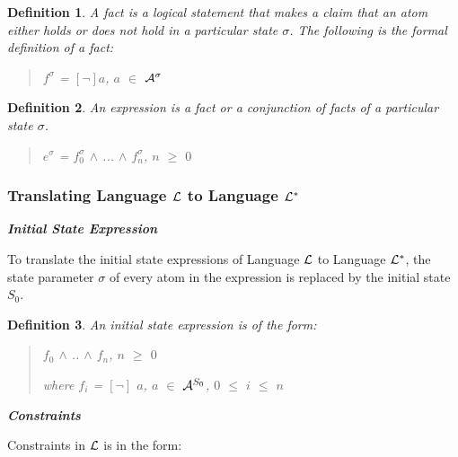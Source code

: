 \documentclass[10pt, twocolumn]{article}
\newtheorem{definition}{Definition}
\begin{document}
        \begin{definition}
          A fact is a logical statement that makes a claim that an atom either
          holds or does not hold in a particular state $\sigma$. The following
          is the formal definition of a fact:

          \begin{quote}
            $f^{\sigma}$ = $[\lnot]$$a$, $a$ $\in$ ${\cal A}^{\sigma}$
          \end{quote}
        \end{definition}

        \begin{definition}
          An expression is a fact or a conjunction of facts of a particular
          state $\sigma$.

          \begin{quote}
            $e^{\sigma}$ = $f^{\sigma}_{0}$ $\land$ ... $\land$ $f^{\sigma}_{n}$, $n$ $\geq$ $0$
          \end{quote}
        \end{definition}

      \subsubsection{Translating Language ${\cal L}$ to Language ${\cal L^{*}}$}

        \noindent \textbf{\emph{Initial State Expression}}

          To translate the initial state expressions of Language ${\cal L}$ to
          Language ${\cal L}^{*}$, the state parameter $\sigma$ of every atom
          in the expression is replaced by the initial state $S_{0}$.

          \begin{definition}
            An initial state expression is of the form:

            \begin{quote}
              $f_{0}$ $\land$ .. $\land$ $f_{n}$, $n$ $\geq$ $0$

              where $f_{i}$ = $[\lnot]$ $a$, $a$ $\in$ ${\cal A}^{S_{0}}$, $0$ $\leq$ $i$ $\leq$ $n$
            \end{quote}

          \end{definition}

        \noindent \textbf{\emph{Constraints}}

          Constraints in ${\cal L}$ is in the form:
\end{document}
